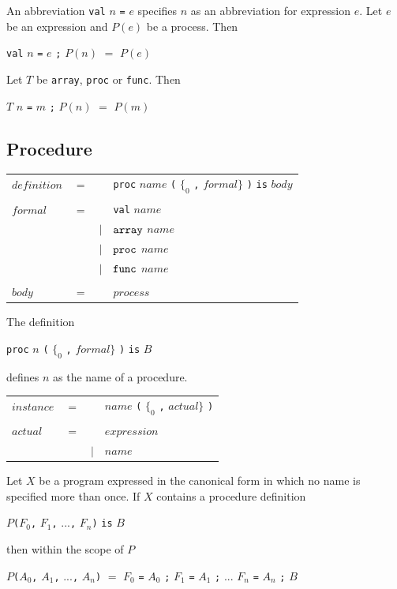 \documentclass[a4paper, 12pt]{article}
\begin{document}
An abbreviation \verb|val| $n$ \verb|=| $e$ specifies $n$ as an abbreviation for expression $e$. 
Let $e$ be an expression and $P(e)$ be a process. Then

\verb|val| $n$ \verb|=| $e$ \verb|;| $P(n)$ $=$ $P(e)$

Let $T$ be \verb|array|, \verb|proc| or \verb|func|. Then

$T$ $n$ \verb|=| $m$ \verb|;| $P(n)$ $=$ $P(m)$

\subsection*{Procedure}

\begin{tabular}{llll}
$definition$    & $=$ &&\verb|proc| $name$ \verb|(| $\{_0$ \verb:,: $formal \}$ \verb|)| \verb|is| $body$\\
\\
$formal$ & $=$ &&\verb|val| $name$\\
                      &&$|$&$\verb|array|$ $name$\\
                      &&$|$&$\verb|proc|$ $name$\\
                      &&$|$&$\verb|func|$ $name$\\ 
\\
$body$ & $=$ && $process$ 
\end{tabular}   

The definition 

\verb|proc| $n$ \verb|(| $\{_0$ \verb:,: $formal \}$ \verb|)| \verb|is| $B$

defines $n$ as the name of a procedure. 

\begin{tabular}{llll}
$instance$    & $=$ &&$name$ \verb|(| $\{_0$ \verb:,: $actual \}$ \verb|)| \\
\\
$actual$ & $=$ &&$expression$\\
                      &&$|$& $name$
\end{tabular}   

Let $X$ be a program expressed in the canonical form in which no name is specified more than once. If $X$
contains a procedure definition 

$P$\verb|(|$F_0$\verb|,| $F_1$\verb|,| ...\verb|,| $F_n$\verb|)| \verb|is| $B$

then within the scope of $P$

$P$\verb|(|$A_0$\verb|,| $A_1$\verb|,| ...\verb|,| $A_n$\verb|)| $=$ $F_0$ \verb|=| $A_0$ \verb|;| $F_1$ \verb|=| $A_1$ \verb|;| ... $F_n$ \verb|=| $A_n$ \verb|;| $B$
\end{document}
